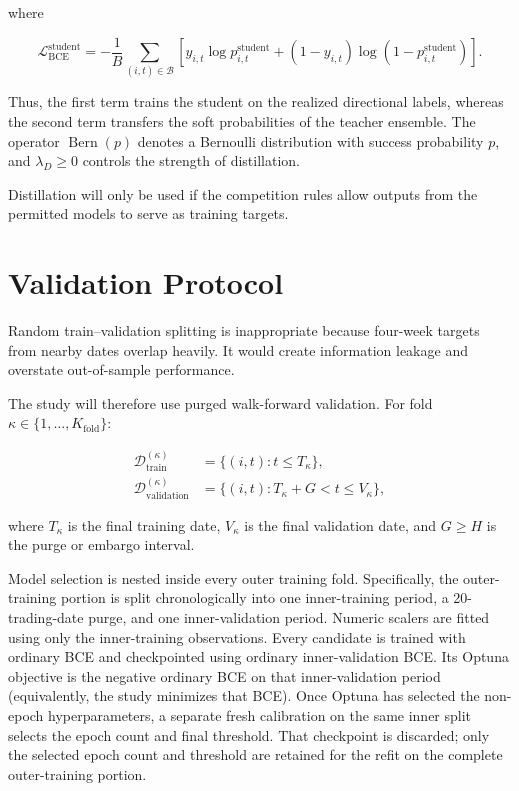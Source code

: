\documentclass[11pt]{article}
\begin{document}
where

\begin{equation}
\mathcal{L}^{\mathrm{student}}_{\mathrm{BCE}}
=
-\frac{1}{B}
\sum_{(i,t)\in\mathcal B}
\left[
y_{i,t}\log p^{\mathrm{student}}_{i,t}
+(1-y_{i,t})\log\left(1-p^{\mathrm{student}}_{i,t}\right)
\right].
\end{equation}

Thus, the first term trains the student on the realized directional labels,
whereas the second term transfers the soft probabilities of the teacher
ensemble. The operator $\operatorname{Bern}(p)$ denotes a Bernoulli
distribution with success probability $p$, and $\lambda_D\geq 0$ controls the
strength of distillation.

Distillation will only be used if the competition rules allow outputs from the
permitted models to serve as training targets.

\section{Validation Protocol}

Random train--validation splitting is inappropriate because four-week targets
from nearby dates overlap heavily. It would create information leakage and
overstate out-of-sample performance.

The study will therefore use purged walk-forward validation. For fold
$\kappa\in\{1,\ldots,K_{\mathrm{fold}}\}$:

\begin{align}
\mathcal D_{\mathrm{train}}^{(\kappa)}
&=
\{(i,t): t\leq T_\kappa\},\\
\mathcal D_{\mathrm{validation}}^{(\kappa)}
&=
\{(i,t): T_\kappa+G < t\leq V_\kappa\},
\end{align}

where $T_\kappa$ is the final training date, $V_\kappa$ is the final
validation date, and $G\geq H$ is the purge or embargo interval.

Model selection is nested inside every outer training fold. Specifically, the
outer-training portion is split chronologically into one inner-training
period, a 20-trading-date purge, and one inner-validation period. Numeric
scalers are fitted using only the inner-training observations. Every candidate
is trained with ordinary BCE and checkpointed using ordinary
inner-validation BCE. Its Optuna objective is the negative ordinary BCE on
that inner-validation period (equivalently, the study minimizes that BCE).
Once Optuna has selected the non-epoch hyperparameters, a
separate fresh calibration on the same inner split selects the epoch count and
final threshold. That checkpoint is discarded; only the selected epoch count
and threshold are retained for the refit on the complete outer-training
portion.
\end{document}
